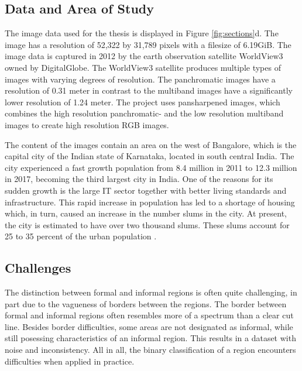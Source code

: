 \subsection{Data and Area of Study}
The image data used for the thesis is displayed in Figure \ref{fig:sections}d. The image has a resolution of 52,322 by 31,789 pixels with a filesize of 6.19GiB.
The image data is captured in 2012 by the earth observation satellite WorldView3 owned by DigitalGlobe. The WorldView3 satellite produces multiple types of images
with varying degrees of resolution. The panchromatic images have a resolution
of 0.31 meter in contrast to  the multiband images have a significantly lower
resolution of 1.24 meter. The project uses pansharpened images, which combines
the high resolution panchromatic- and the low resolution multiband images to
create high resolution RGB images.

The content of the images contain an area on the west of Bangalore, which is the capital city of the Indian state of Karnataka, located in south central India. The city experienced a fast growth population from 8.4 million in 2011 to 12.3 million in 2017, becoming the third largest city in India\cite{popcount2017}. One of the reasons for its sudden growth is the large IT sector together with better living standards and infrastructure. This rapid increase in population has led to a shortage of housing which, in turn, caused an increase in the number slums in the city. At present, the city is estimated to have over two thousand slums. These slums account for 25 to 35 percent of the urban population \cite{roy2018survey}.



\subsection{Challenges}

The distinction between formal and informal regions is often quite challenging,
in part due to the vagueness of borders between the regions. The border between
formal and informal regions often resembles more of a spectrum than a clear cut line.
Besides border difficulties, some areas are not designated as informal, while
still posessing characteristics of an informal region. This results in
a dataset with noise and inconsistency.  All in all, the binary classification
of a region encounters difficulties when applied in practice. 


